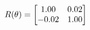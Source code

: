 \documentclass[preview]{standalone}
\begin{document}
\begin{align*}
\special{dvisvgm:raw <g id='unique000'>}R(\theta) = \begin{bmatrix}1.00 & 0.02\\-0.02 & 1.00\end{bmatrix}\special{dvisvgm:raw </g>}
\end{align*}
\end{document}

